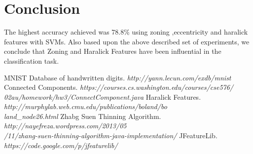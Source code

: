 \documentclass[conference]{IEEEtran}
\begin{document}
\section{Conclusion}
The highest accuracy achieved was 78.8\% using zoning ,eccentricity and haralick features with SVMs. Also based upon the above described set of experiments, we conclude that Zoning and Haralick Features have been influential in the classification task.


\begin{thebibliography}{0}
 MNIST Database of handwritten digits. 
\emph{http://yann.lecun.com/exdb/mnist}
 Connected Components. 
\emph{https://courses.cs.washington.edu/courses/cse576/ \\ 02au/homework/hw3/ConnectComponent.java}
Haralick Features. 
\emph{http://murphylab.web.cmu.edu/publications/boland/bo \\ land\_node26.html}
Zhabg Suen Thinning Algorithm. 
\emph{http://nayefreza.wordpress.com/2013/05 \\ /11/zhang-suen-thinning-algorithm-java-implementation/}
JFeatureLib. 
\emph{https://code.google.com/p/jfeaturelib/}
\end{thebibliography}
\end{document}
